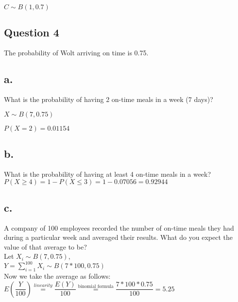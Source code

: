 \documentclass[12pt]{article}
\newcommand\tab[1][1cm]{\hspace*{#1}}
\begin{document}
$ C \sim B(1, 0.7) $


\newpage

\begin{center}
\section*{Question 4}
\end{center}

The probability of Wolt arriving on time is 0.75.

\subsection*{a.} 

What is the probability of having 2 on-time meals in a week (7 days)?

$ X \sim B(7, 0.75) $

$ P(X=2) = 0.01154 $

\subsection*{b.}

What is the probability of having at least 4 on-time meals in a week? \\

$ P(X \geq 4) =  1 - P(X \leq 3) = 1 - 0.07056 = 0.92944$ 

\subsection*{c.}

\tab A company of 100 employees recorded the number of on-time meals they had during a particular week and averaged their results. What do you expect the value of that average to be? \\

Let $X_i \sim B(7, 0.75) $, \\

$Y = \sum_{i=1}^{100} X_i \sim B(7* 100, 0.75) $\\

Now we take the average as follows: \\

$E(\dfrac{Y}{100}) \stackrel{linearity}{=} \dfrac{E(Y)}{100} \stackrel{\text{binomial formula}}{=} \dfrac{7*100*0.75}{100}  = 5.25 $

    
\end{document}
